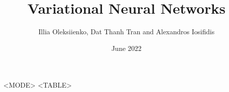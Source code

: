 \documentclass{article}
\title{Variational Neural Networks}
\author{Illia Oleksiienko, Dat Thanh Tran and Alexandros Iosifidis}
\date{June 2022}
\begin{document}
\maketitle

\begin{center}
    \begin{tabular}{<MODE>}
    <TABLE>
    \end{tabular}
\end{center}
\end{document}
